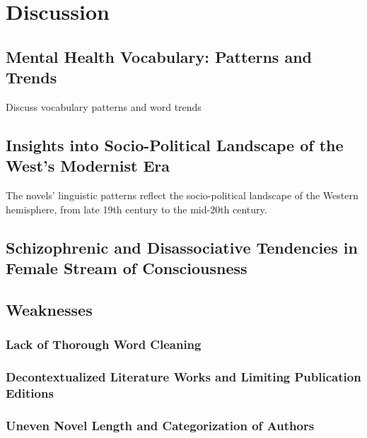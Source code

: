 \documentclass[
  letterpaper,
  DIV=11,
  numbers=noendperiod]{scrartcl}
\begin{document}
\section{Discussion}\label{discussion}

\subsection{Mental Health Vocabulary: Patterns and
Trends}\label{mental-health-vocabulary-patterns-and-trends}

Discuss vocabulary patterns and word trends

\subsection{Insights into Socio-Political Landscape of the West's
Modernist
Era}\label{insights-into-socio-political-landscape-of-the-wests-modernist-era}

The novels' linguistic patterns reflect the socio-political landscape of
the Western hemisphere, from late 19th century to the mid-20th century.

\subsection{Schizophrenic and Disassociative Tendencies in Female Stream
of
Consciousness}\label{schizophrenic-and-disassociative-tendencies-in-female-stream-of-consciousness}

\subsection{Weaknesses}\label{weaknesses}

\subsubsection{Lack of Thorough Word
Cleaning}\label{lack-of-thorough-word-cleaning}

\subsubsection{Decontextualized Literature Works and Limiting
Publication
Editions}\label{decontextualized-literature-works-and-limiting-publication-editions}

\subsubsection{Uneven Novel Length and Categorization of
Authors}\label{uneven-novel-length-and-categorization-of-authors}
\end{document}
